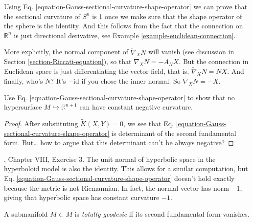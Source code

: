 \begin{example}
\label{example-sectional-curvature-of-sphere}
Using Eq. \ref{equation-Gauss-sectional-curvature-shape-operator} we can prove that the sectional
curvature of $S^n$ is 1 once we make sure that the shape operator of the sphere
is the identity. And this follows from the fact that the connection on
$\mathbb{R}^n$ is just directional derivative, see Example 
\ref{example-euclidean-connection}.

More explicitly, the normal component of $\tilde{\nabla}_X N$ will vanish (see
discussion in Section \ref{section-Riccati-equation}), so that
$\tilde{\nabla}_XN=-A_N X$. But the connection in Euclidean space is just
differentiating the vector field, that is, $\tilde{\nabla}_X N=N X$. And
finally, who's $N$? It's $-\text{id}$ if you chose the inner normal. So
 $\tilde{\nabla}_X N=-X$.
\end{example}

\begin{exercise}
\label{exercise-Gauss-sectional}
Use Eq. \ref{equation-Gauss-sectional-curvature-shape-operator} to show that no 
hypersurface $M \hookrightarrow \mathbb{R}^{n+1}$ can have constant negative 
curvature.
\end{exercise}

\begin{proof}
After substituting $\tilde{K}(X,Y)=0$, we see that Eq. 
\ref{equation-Gauss-sectional-curvature-shape-operator} is determinant of the second fundamental form. 
 But… how to argue that this determinant can't be always negative?
\end{proof}

\begin{example}
\label{example-hyperbolic-space}
\cite{doc}, Chapter VIII, Exercise 3. The unit normal of hyperbolic space in the
hyperboloid model is also the identity. This allows for a similar computation,
but Eq. \ref{equation-Gauss-sectional-curvature-shape-operator} doesn't hold 
exactly because the
metric is not Riemannian. In fact, the normal vector has norm $-1$, giving that
hyperbolic space has constant curvature $-1$.
\end{example}

\begin{definition}
\label{definition-totally-geodesic-submanifold}
A submanifold $M\subset\tilde{M}$ is {\it totally geodesic} if its second
fundamental form vanishes.
\end{definition}

